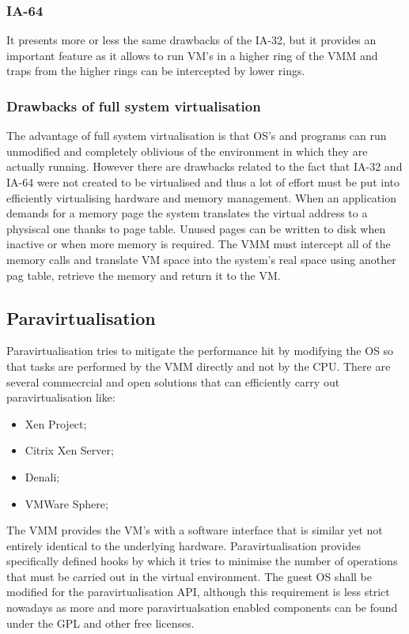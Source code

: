 \subsubsection{IA-64} 
It presents more or less the same drawbacks of the
IA-32, but it provides an important feature as it allows to run VM's in a higher ring of the VMM and traps from the
higher rings can be intercepted by lower rings.
\subsubsection{Drawbacks of full system virtualisation} 
The advantage of full system virtualisation is that OS's and programs can run unmodified and completely oblivious of the
environment in which they are actually running. However there are drawbacks related to the fact that IA-32 and IA-64
were not created to be virtualised and thus a lot of effort must be put into efficiently virtualising hardware and
memory management. When an application demands for a memory page the system translates the virtual address to a
physiscal one thanks to page table. Unused pages can be written to disk when inactive or when more memory is required.
The VMM must intercept all of the memory calls and translate VM space into the system's real space using another pag table,
retrieve the memory and return it to the VM.
\subsection{Paravirtualisation}
Paravirtualisation tries to mitigate the performance hit by modifying the OS so that tasks are performed by the VMM
directly and not by the CPU. There are several commecrcial and open solutions that can efficiently carry out
paravirtualisation like:
\begin{itemize} 
    \item Xen Project;
    \item Citrix Xen Server;
    \item Denali;
    \item VMWare Sphere;
\end{itemize} 
The VMM provides the VM's with a software interface that is similar yet not entirely identical to the underlying
hardware. Paravirtualisation provides specifically defined hooks by which it tries to minimise the number of
operations that must be carried out in the virtual environment. The guest OS shall be modified for the
paravirtualisation API, although this requirement is less strict nowadays as more and more paravirtualsation
enabled components can be found under the GPL and other free licenses.

